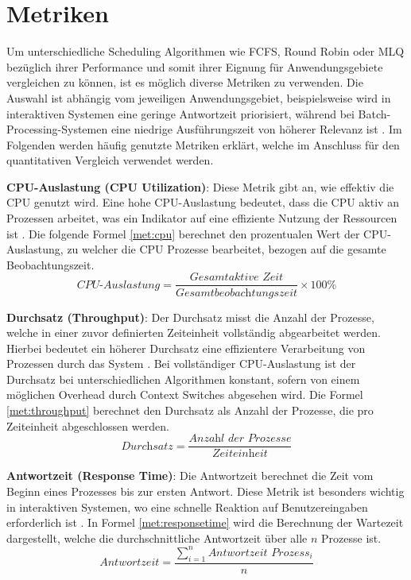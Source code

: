 
\section{Metriken}
Um unterschiedliche Scheduling Algorithmen wie \ac{FCFS}, Round Robin oder \ac{MLQ} bezüglich ihrer Performance und somit ihrer Eignung für Anwendungsgebiete vergleichen zu können, ist es möglich diverse Metriken zu verwenden. Die Auswahl ist abhängig vom jeweiligen Anwendungsgebiet, beispielsweise wird in interaktiven Systemen eine geringe Antwortzeit priorisiert, während bei Batch-Processing-Systemen eine niedrige Ausführungszeit von höherer Relevanz ist \autocite{thombare_efficient_2016}. Im Folgenden werden häufig genutzte Metriken erklärt, welche im Anschluss für den quantitativen Vergleich verwendet werden.


\textbf{\ac{CPU}-Auslastung (\ac{CPU} Utilization)}: Diese Metrik gibt an, wie effektiv die \ac{CPU} genutzt wird. Eine hohe \ac{CPU}-Auslastung bedeutet, dass die \ac{CPU} aktiv an Prozessen arbeitet, was ein Indikator auf eine effiziente Nutzung der Ressourcen ist \autocite{pemasinghe_comparison_2022}. Die folgende Formel \ref{met:cpu} berechnet den prozentualen Wert der \ac{CPU}-Auslastung, zu welcher die \ac{CPU} Prozesse bearbeitet, bezogen auf die gesamte Beobachtungszeit.
\begin{equation}
	\textit{CPU-Auslastung} = \frac{\textit{Gesamtaktive Zeit}}{\textit{Gesamtbeobachtungszeit}} \times 100\%
	\label{met:cpu}
\end{equation}


\textbf{Durchsatz (Throughput)}: Der Durchsatz misst die Anzahl der Prozesse, welche in einer zuvor definierten Zeiteinheit vollständig abgearbeitet werden. Hierbei bedeutet ein höherer Durchsatz eine effizientere Verarbeitung von Prozessen durch das System  \autocite{pemasinghe_comparison_2022}. Bei vollständiger \ac{CPU}-Auslastung ist der Durchsatz bei unterschiedlichen Algorithmen konstant, sofern von einem möglichen Overhead durch Context Switches abgesehen wird. Die Formel \ref{met:throughput} berechnet den Durchsatz als Anzahl der Prozesse, die pro Zeiteinheit abgeschlossen werden.
\begin{equation}
	\textit{Durchsatz} = \frac{\textit{Anzahl\ der\ Prozesse}}{\textit{Zeiteinheit}}
	\label{met:throughput}
\end{equation}


\textbf{Antwortzeit (Response Time)}: Die Antwortzeit berechnet die Zeit vom Beginn eines Prozesses bis zur ersten Antwort. Diese Metrik ist besonders wichtig in interaktiven Systemen, wo eine schnelle Reaktion auf Benutzereingaben erforderlich ist  \autocite{pemasinghe_comparison_2022}. In Formel \ref{met:responsetime} wird die Berechnung der Wartezeit dargestellt, welche die durchschnittliche Antwortzeit über alle \( n \) Prozesse ist.
\begin{equation}
	\textit{Antwortzeit} = \frac{\sum_{i=1}^{n} \textit{Antwortzeit Prozess}_{i}}{n}
	\label{met:responsetime}
\end{equation}


